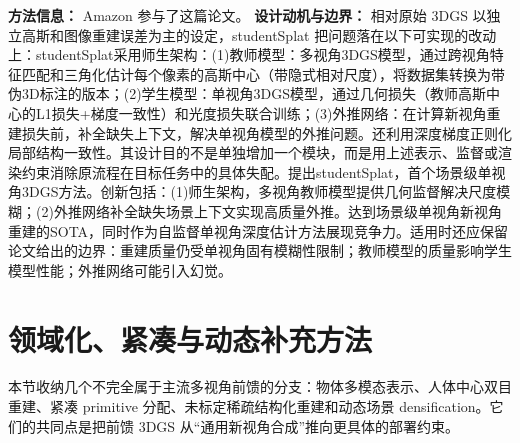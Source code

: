 \textbf{方法信息：} Amazon 参与了这篇论文。
\textbf{设计动机与边界：} 相对原始 3DGS 以独立高斯和图像重建误差为主的设定，studentSplat 把问题落在以下可实现的改动上：studentSplat采用师生架构：(1)教师模型：多视角3DGS模型，通过跨视角特征匹配和三角化估计每个像素的高斯中心（带隐式相对尺度），将数据集转换为带伪3D标注的版本；(2)学生模型：单视角3DGS模型，通过几何损失（教师高斯中心的L1损失+梯度一致性）和光度损失联合训练；(3)外推网络：在计算新视角重建损失前，补全缺失上下文，解决单视角模型的外推问题。还利用深度梯度正则化局部结构一致性。其设计目的不是单独增加一个模块，而是用上述表示、监督或渲染约束消除原流程在目标任务中的具体失配。提出studentSplat，首个场景级单视角3DGS方法。创新包括：(1)师生架构，多视角教师模型提供几何监督解决尺度模糊；(2)外推网络补全缺失场景上下文实现高质量外推。达到场景级单视角新视角重建的SOTA，同时作为自监督单视角深度估计方法展现竞争力。适用时还应保留论文给出的边界：重建质量仍受单视角固有模糊性限制；教师模型的质量影响学生模型性能；外推网络可能引入幻觉。

\section{领域化、紧凑与动态补充方法}

本节收纳几个不完全属于主流多视角前馈的分支：物体多模态表示、人体中心双目重建、紧凑 primitive 分配、未标定稀疏结构化重建和动态场景 densification。它们的共同点是把前馈 3DGS 从“通用新视角合成”推向更具体的部署约束。
